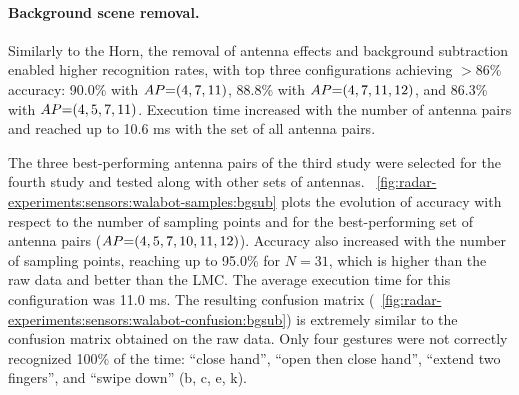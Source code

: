 \paragraph{Background scene removal.}
Similarly to the Horn, the removal of antenna effects and background subtraction enabled higher recognition rates, with top three configurations achieving ${>}86\%$ accuracy: 90.0\% with $\splitatcommas{AP{=}(4, 7, 11)}$, 88.8\% with $\splitatcommas{AP{=}(4, 7, 11, 12)}$, and 86.3\% with $\splitatcommas{AP{=}(4, 5, 7, 11)}$. Execution time increased with the number of antenna pairs and reached up to 10.6 ms with the set of all antenna pairs. 

The three best-performing antenna pairs of the third study were selected for the fourth study and tested along with other sets of antennas. 
%
\fig~\ref{fig:radar-experiments:sensors:walabot-samples:bgsub} plots the evolution of accuracy with respect to the number of sampling points and for the best-performing set of antenna pairs ($\splitatcommas{AP{=}(4,5,7,10,11,12)}$). 
%
Accuracy also increased with the number of sampling points, reaching up to 95.0\% for $N{=}31$, which is higher than the raw data and better than the LMC. The average execution time for this configuration was 11.0 ms.
%
The resulting confusion matrix (\fig~\ref{fig:radar-experiments:sensors:walabot-confusion:bgsub}) is extremely similar to the confusion matrix obtained on the raw data. Only four gestures were not correctly recognized 100\% of the time: ``close hand'', ``open then close hand'', ``extend two fingers'', and ``swipe down'' (b, c, e, k).

